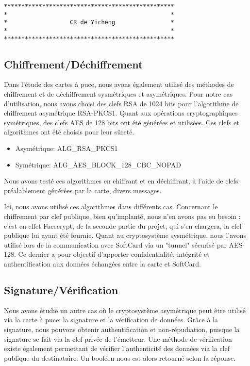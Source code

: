 \documentclass[a4paper,11pt,french]{article}
\begin{document}
\begin{verbatim}
*************************************************
*                                               *
*                  CR de Yicheng                *
*                                               *
*************************************************
\end{verbatim}


\subsection{Chiffrement/Déchiffrement}
Dans l'étude des cartes à puce, nous avons également utilisé des méthodes de 
chiffrement et de déchiffrement sysmétriques et asymétriques. Pour notre cas 
d'utilisation, nous avons choisi des clefs RSA de 1024 bits pour l'algorithme de
chiffrement asymétrique RSA-PKCS1. Quant aux opérations cryptographiques 
symétriques, des clefs AES de 128 bits ont été générées et utilisées. Ces clefs
et algorithmes ont été choisis pour leur sûreté.


\begin{itemize}
	\item Asymétrique: ALG\_RSA\_PKCS1
	\item Symétrique: ALG\_AES\_BLOCK\_128\_CBC\_NOPAD 
\end{itemize}

Nous avons testé ces algorithmes en chiffrant et en déchiffrant, à l'aide de 
clefs préalablement générées par la carte, divers messages. 

Ici, nous avons utilisé ces algorithmes dans différents cas. Concernant
le chiffrement par clef publique, bien qu'implanté, nous n'en avons pas eu 
besoin : c'est en effet Facecrypt, de la seconde partie du projet, qui s'en 
chargera, la clef publique lui ayant été fournie. Quant au cryptosystème 
sysmétrique, nous l'avons utilisé lors de la communication avec SoftCard
via un "tunnel" sécurisé par AES-128. Ce dernier a pour objectif d'apporter 
confidentialité, intégrité et authentification aux données échangées entre la 
carte et SoftCard.

\subsection{Signature/Vérification}
Nous avons étudié un autre cas où le cryptosystème asymétrique peut être utilisé
via la carte à puce: la signature et la vérification de données. Grâce à la 
signature, nous pouvons obtenir authentification et non-répudiation, puisque la
signature se fait via la clef privée de l'émetteur. Une méthode de vérification
existe également permettant de vérifier l'authenticité des données via la clef 
publique du destinataire. Un booléen nous est alors retourné selon la réponse.
\end{document}
